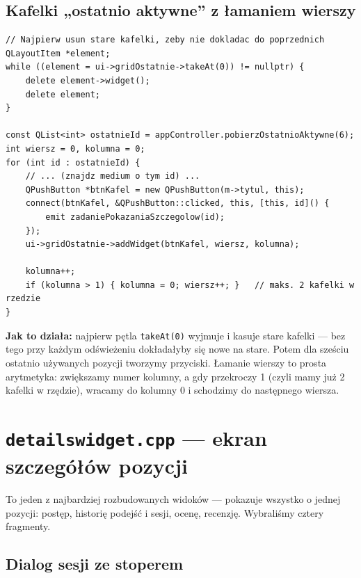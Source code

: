 \documentclass[11pt,a4paper]{article}
\begin{document}
\subsection{Kafelki „ostatnio aktywne” z łamaniem wierszy}

\begin{lstlisting}[caption={Czyszczenie siatki i układanie kafelków po 2 w rzędzie}]
// Najpierw usun stare kafelki, zeby nie dokladac do poprzednich
QLayoutItem *element;
while ((element = ui->gridOstatnie->takeAt(0)) != nullptr) {
    delete element->widget();
    delete element;
}

const QList<int> ostatnieId = appController.pobierzOstatnioAktywne(6);
int wiersz = 0, kolumna = 0;
for (int id : ostatnieId) {
    // ... (znajdz medium o tym id) ...
    QPushButton *btnKafel = new QPushButton(m->tytul, this);
    connect(btnKafel, &QPushButton::clicked, this, [this, id]() {
        emit zadaniePokazaniaSzczegolow(id);
    });
    ui->gridOstatnie->addWidget(btnKafel, wiersz, kolumna);

    kolumna++;
    if (kolumna > 1) { kolumna = 0; wiersz++; }   // maks. 2 kafelki w rzedzie
}
\end{lstlisting}

\textbf{Jak to działa:} najpierw pętla \texttt{takeAt(0)} wyjmuje i kasuje stare
kafelki --- bez tego przy każdym odświeżeniu dokładałyby się nowe na stare.
Potem dla sześciu ostatnio używanych pozycji tworzymy przyciski. Łamanie wierszy
to prosta arytmetyka: zwiększamy numer kolumny, a gdy przekroczy 1 (czyli mamy
już 2 kafelki w rzędzie), wracamy do kolumny 0 i schodzimy do następnego wiersza.

\section{\texttt{detailswidget.cpp} --- ekran szczegółów pozycji}

To jeden z najbardziej rozbudowanych widoków --- pokazuje wszystko o jednej
pozycji: postęp, historię podejść i sesji, ocenę, recenzję. Wybraliśmy cztery
fragmenty.

\subsection{Dialog sesji ze stoperem}
\end{document}
